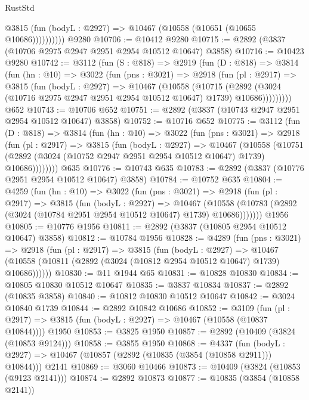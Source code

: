 \begin{lexlean}{RustStd}
\begin{coremodule}
              @3815 (fun (bodyL : @2927) => @10467 (@10558 (@10651 (@10655 @10686))))))))))
    @9280
@10706 := @10412 @9280
@10715 := @2892 (@3837 (@10706 @2975 @2947 @2951 @2954 @10512 @10647) @3858)
@10716 := @10423 @9280
@10742 := @3112
    (fun (S : @818) =>
    @2919
      (fun (D : @818) =>
      @3814
        (fun (hn : @10) =>
        @3022
          (fun (pns : @3021) =>
          @2918
            (fun (pl : @2917) =>
            @3815
              (fun (bodyL : @2927) =>
              @10467
                (@10558
                  (@10715
                    (@2892
                      (@3024 (@10716 @2975 @2947 @2951 @2954 @10512 @10647) @1739)
                      @10686)))))))))
    @652
@10743 := @10706 @652
@10751 := @2892 (@3837 (@10743 @2947 @2951 @2954 @10512 @10647) @3858)
@10752 := @10716 @652
@10775 := @3112
    (fun (D : @818) =>
    @3814
      (fun (hn : @10) =>
      @3022
        (fun (pns : @3021) =>
        @2918
          (fun (pl : @2917) =>
          @3815
            (fun (bodyL : @2927) =>
            @10467
              (@10558
                (@10751 (@2892 (@3024 (@10752 @2947 @2951 @2954 @10512 @10647) @1739) @10686))))))))
    @635
@10776 := @10743 @635
@10783 := @2892 (@3837 (@10776 @2951 @2954 @10512 @10647) @3858)
@10784 := @10752 @635
@10804 := @4259
    (fun (hn : @10) =>
    @3022
      (fun (pns : @3021) =>
      @2918
        (fun (pl : @2917) =>
        @3815
          (fun (bodyL : @2927) =>
          @10467
            (@10558 (@10783 (@2892 (@3024 (@10784 @2951 @2954 @10512 @10647) @1739) @10686)))))))
    @1956
@10805 := @10776 @1956
@10811 := @2892 (@3837 (@10805 @2954 @10512 @10647) @3858)
@10812 := @10784 @1956
@10828 := @4289
    (fun (pns : @3021) =>
    @2918
      (fun (pl : @2917) =>
      @3815
        (fun (bodyL : @2927) =>
        @10467 (@10558 (@10811 (@2892 (@3024 (@10812 @2954 @10512 @10647) @1739) @10686))))))
@10830 := @11 @1944 @65
@10831 := @10828 @10830
@10834 := @10805 @10830 @10512 @10647
@10835 := @3837 @10834
@10837 := @2892 (@10835 @3858)
@10840 := @10812 @10830 @10512 @10647
@10842 := @3024 @10840 @1739
@10844 := @2892 @10842 @10686
@10852 := @3109
    (fun (pl : @2917) => @3815 (fun (bodyL : @2927) => @10467 (@10558 (@10837 @10844))))
    @1950
@10853 := @3825 @1950
@10857 := @2892 (@10409 (@3824 (@10853 @9124)))
@10858 := @3855 @1950
@10868 := @4337
    (fun (bodyL : @2927) => @10467 (@10857 (@2892 (@10835 (@3854 (@10858 @2911))) @10844)))
    @2141
@10869 := @3060 @10466
@10873 := @10409 (@3824 (@10853 (@9123 @2141)))
@10874 := @2892 @10873
@10877 := @10835 (@3854 (@10858 @2141))

\end{coremodule}
\end{lexlean}
